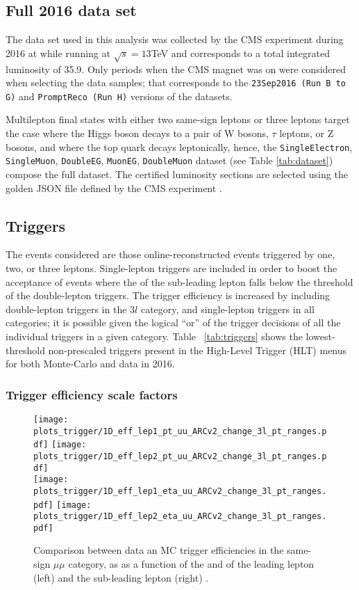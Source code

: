 \subsection{ Full 2016 data set}

The data set used in this analysis was collected by the CMS experiment during 2016 at while running at $\sqrt{s}=13$TeV and corresponds to a total integrated luminosity of 35.9\fbinv. Only periods when the CMS magnet was on were considered when selecting the data samples; that corresponds to the \verb|23Sep2016 (Run B to G)| and \verb|PromptReco (Run H)| versions of the datasets.

Multilepton final states with either two same-sign leptons or three leptons target the case where the Higgs boson decays to a pair of W bosons, $\tau$ leptons, or Z bosons, and where the top quark decays leptonically, hence, the \verb|SingleElectron|, \verb|SingleMuon|, \verb|DoubleEG|, \verb|MuonEG|, \verb|DoubleMuon| dataset (see Table \ref{tab:dataset}) compose the full dataset. The certified luminosity sections are selected using the golden JSON file defined by the CMS experiment \cite{json}.

\subsection{Triggers}

The events considered are those online-reconstructed events triggered by one, two, or three leptons. Single-lepton triggers are included in order to boost the acceptance of events where the \pt of the sub-leading lepton falls below the threshold of the double-lepton triggers. The trigger efficiency is increased by including double-lepton triggers in the $3l$ category, and single-lepton triggers in all categories; it is possible given the logical ``or'' of the trigger decisions of all the individual triggers in a given category. Table ~\ref{tab:triggers} shows the lowest-threshold non-prescaled triggers present in the High-Level Trigger (HLT) menus for both Monte-Carlo and data in 2016.

\subsubsection*{Trigger efficiency scale factors}

\begin{figure}[htp]
\centering
\texttt{[image: plots\_trigger/1D\_eff\_lep1\_pt\_uu\_ARCv2\_change\_3l\_pt\_ranges.pdf]}
\texttt{[image: plots\_trigger/1D\_eff\_lep2\_pt\_uu\_ARCv2\_change\_3l\_pt\_ranges.pdf]} \\
\texttt{[image: plots\_trigger/1D\_eff\_lep1\_eta\_uu\_ARCv2\_change\_3l\_pt\_ranges.pdf]}
\texttt{[image: plots\_trigger/1D\_eff\_lep2\_eta\_uu\_ARCv2\_change\_3l\_pt\_ranges.pdf]}
\caption[Trigger efficiency for the same-sign $\mu\mu$ category]{Comparison between data an MC trigger efficiencies in the same-sign $\mu\mu$ category, as as a function of the \pt and  \etac of the leading lepton (left) and the sub-leading lepton (right) \cite{CMS_AN_2017-029}.}
\label{fig:trigeffsmumu}
\end{figure}

